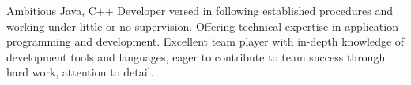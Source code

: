 

\begin{cvparagraph}

Ambitious Java, C++ Developer versed in following established procedures and working under little or no supervision. Offering technical expertise in application programming and development. Excellent team player with in-depth knowledge of development tools and languages, eager to contribute to team success through hard work, attention to detail.
\end{cvparagraph}
